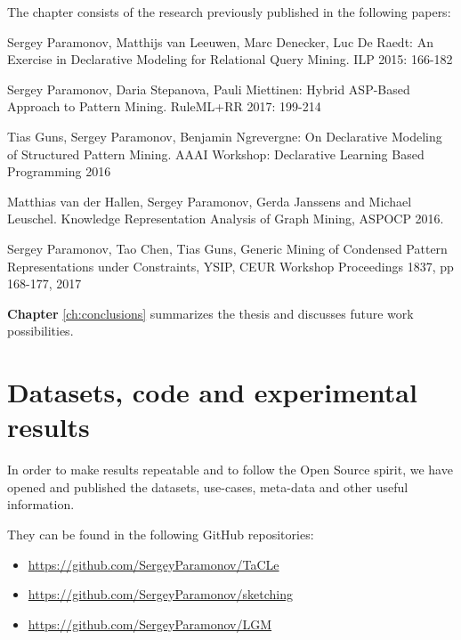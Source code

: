 The chapter consists of the research previously published in the following papers:
\begin{addmargin}[2em]{2em}
Sergey Paramonov, Matthijs van Leeuwen, Marc Denecker, Luc De Raedt:
An Exercise in Declarative Modeling for Relational Query Mining. ILP
2015: 166-182


Sergey Paramonov, Daria Stepanova, Pauli Miettinen:
Hybrid ASP-Based Approach to Pattern Mining. RuleML+RR 2017: 199-214


Tias Guns, Sergey Paramonov, Benjamin Ngrevergne:  On Declarative Modeling of Structured Pattern Mining. AAAI Workshop:
  Declarative Learning Based Programming 2016

Matthias van der Hallen, Sergey Paramonov, Gerda Janssens and
  Michael Leuschel.   Knowledge Representation Analysis of Graph
  Mining, ASPOCP 2016.

Sergey Paramonov, Tao Chen, Tias Guns, Generic Mining of Condensed
Pattern Representations under Constraints, YSIP, CEUR Workshop
Proceedings 1837, pp 168-177, 2017

\end{addmargin}

\textbf{Chapter} \ref{ch:conclusions} summarizes the thesis and
discusses future work possibilities.

\section{Datasets, code and experimental results}
In order to make results repeatable and to follow the Open Source
spirit, we have opened and published the datasets, use-cases,
meta-data and other useful information.

They can be found in the following GitHub repositories:
\begin{itemize}
\item \url{https://github.com/SergeyParamonov/TaCLe}
\item \url{https://github.com/SergeyParamonov/sketching}
\item \url{https://github.com/SergeyParamonov/LGM}
\end{itemize}
\cleardoublepage
